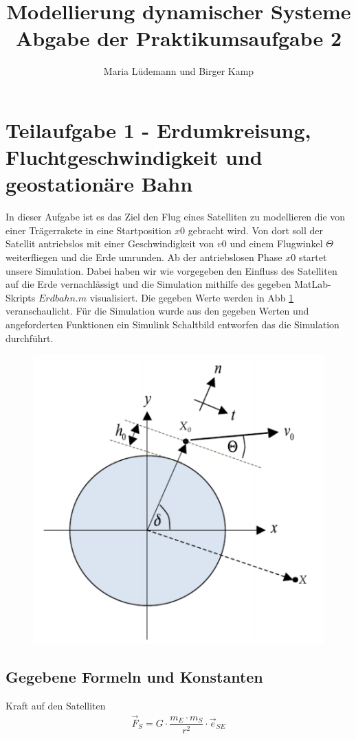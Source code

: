 \documentclass[]{scrartcl}
\title{Modellierung dynamischer Systeme  \\ Abgabe der Praktikumsaufgabe 2}
\author{Maria Lüdemann und Birger Kamp}
\begin{document}
\maketitle
{}
\tableofcontents
\newpage


\section{Teilaufgabe 1 - Erdumkreisung, Fluchtgeschwindigkeit und geostationäre Bahn}
In dieser Aufgabe ist es das Ziel den Flug eines Satelliten zu modellieren die von einer Trägerrakete in eine Startposition $x0$ gebracht wird. Von dort soll der Satellit antriebslos mit einer Geschwindigkeit von $v0$ und einem Flugwinkel $\Theta$ weiterfliegen und die Erde umrunden. Ab der antriebslosen Phase $x0$ startet unsere Simulation. Dabei haben wir wie vorgegeben den Einfluss des Satelliten auf die Erde vernachlässigt und die Simulation mithilfe des gegeben MatLab-Skripts $Erdbahn.m$ visualisiert. Die gegeben Werte werden in Abb \ref{fig:1_BezeichnerDiagramm} veranschaulicht. Für die Simulation wurde aus den gegeben Werten und angeforderten Funktionen ein Simulink Schaltbild entworfen das die Simulation durchführt.

\begin{figure}[H]
\centering
\includegraphics[width=0.5\linewidth]{./1_BezeichnerDiagramm}
\caption{}
\label{fig:1_BezeichnerDiagramm}
\end{figure}

\subsection{Gegebene Formeln und Konstanten}
Kraft auf den Satelliten
\begin{align}
\vec{F}_{S} = G \cdot \dfrac{m_{E} \cdot m_{S}}{r^2} \cdot \vec{e}_{SE}
\end{align}
\end{document}
